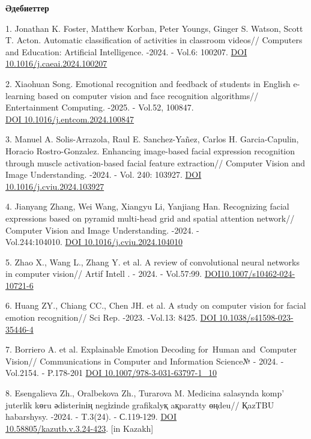 \begin{center}
{\bfseries Әдебиеттер}
\end{center}

\begin{references}
1. Jonathan K. Foster, Matthew Korban, Peter Youngs, Ginger S. Watson,
Scott T. Acton. Automatic classification of activities in classroom
videos// Computers and Education: Artificial Intelligence. -2024. -
Vol.6: 100207. \href{https://doi.org/10.1016/j.caeai.2024.100207}{DOI
10.1016/j.caeai.2024.100207}

2. Xiaohuan Song. Emotional recognition and feedback of students in
English e-learning based on computer vision and face recognition
algorithms// Entertainment Computing. -2025. - Vol.52, 100847.\\
\href{https://doi.org/10.1016/j.entcom.2024.100847}{DOI
10.1016/j.entcom.2024.100847}

3. Manuel A. Solis-Arrazola, Raul E. Sanchez-Yañez, Carlos H.
Garcia-Capulin, Horacio Rostro-Gonzalez. Enhancing image-based facial
expression recognition through muscle activation-based facial feature
extra\-ction// Computer Vision and Image Understanding. -2024. - Vol.
240: 103927. \href{https://doi.org/10.1016/j.cviu.2024.103927}{DOI\\
10.1016/j.cviu.2024.103927}

4. Jianyang Zhang, Wei Wang, Xiangyu Li, Yanjiang Han. Recognizing facial
expressions based on pyramid multi-head grid and spatial attention
network// Computer Vision and Image Understanding. -2024. -\\
Vol.244:104010. \href{https://doi.org/10.1016/j.cviu.2024.104010}{DOI
10.1016/j.cviu.2024.104010}

5. Zhao X., Wang L., Zhang Y. et al. A review of convolutional neural
networks in computer vision// Artif Intell . - 2024. - Vol.57:99.
\href{https://doi.org/10.1007/s10462-024-10721-6}{DOI10.1007/s10462-024-10721-6}

6. Huang ZY., Chiang CC., Chen JH. et al. A study on computer vision for
facial emotion recognition// Sci Rep. -2023. -Vol.13: 8425.
\href{https://doi.org/10.1038/s41598-023-35446-4}{DOI
10.1038/s41598-023-35446-4}

7. Borriero A. et al. Explainable Emotion Decoding for~Human and~Computer
Vision// Communications in Computer and Information Science№ - 2024. -
Vol.2154. - P.178-201
\href{https://doi.org/10.1007/978-3-031-63797-1_10}{DOI
10.1007/978-3-031-63797-1\_10}

8. Esengalieva Zh., Oralbekova Zh., Turarova M. Medicina salasynda
komp' juterlіk kөru әdіsterіnің negіzіnde grafikalyқ
aқparatty өңdeu// ҚazTBU habarshysy. -2024. - T.3(24). - С.119-129.
\href{https://doi.org/10.58805/kazutb.v.3.24-423}{DOI\\
10.58805/kazutb.v.3.24-423}. {[}in Kazakh{]}


\end{references}
